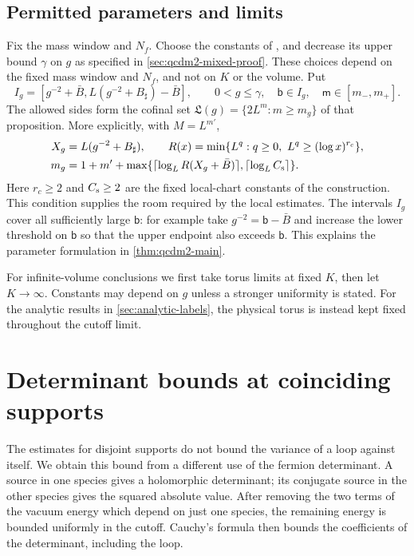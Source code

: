 \documentclass[11pt,letterpaper,reqno]{amsart}
\theoremstyle{definition}
\theoremstyle{remark}
\begin{document}
\subsection{Permitted parameters and limits}

Fix the mass window and $N_f$. Choose the constants of
\cite[Prop. 10.20]{QCDM1}, and decrease its upper bound
$\gamma$ on $g$ as specified in
\cref{sec:qcdm2-mixed-proof}. These choices depend on the fixed
mass window and $N_f$, and not on $K$ or the volume. Put
\[
 I_g=[g^{-2}+\bar B,L(g^{-2}+B_\sharp)-\bar B],\qquad
 0<g\le\gamma,\quad\mathsf b\in I_g,
 \quad\mathsf m\in[m_-,m_+].
\]
The allowed sides form the cofinal set
$\mathfrak L(g)=\{2L^m:m\ge m_g\}$ of that proposition.
More explicitly, with $M=L^{m'}$,
\[
 \begin{split}
 X_g&=L(g^{-2}+B_\sharp),\qquad
 R(x)=\min\{L^q:q\ge0,\ L^q\ge(\log x)^{r_c}\},\\
 m_g&=1+m'+\max\{\lceil\log_LR(X_g+\bar B)\rceil,
                         \lceil\log_L C_{\rm s}\rceil\}.
 \end{split}
\]
Here $r_c\ge2$ and $C_{\rm s}\ge2$ are the fixed local-chart
constants of the construction. This condition supplies the
room required by the local estimates.
The intervals $I_g$ cover all sufficiently large
$\mathsf b$: for example take $g^{-2}=\mathsf b-\bar B$ and
increase the lower threshold on $\mathsf b$ so that the upper
endpoint also exceeds $\mathsf b$. This explains the parameter
formulation in \cref{thm:qcdm2-main}.

For infinite-volume conclusions we first take torus limits at
fixed $K$, then let $K\to\infty$. Constants may depend on
$g$ unless a stronger uniformity is stated. For the analytic
results in \cref{sec:analytic-labels}, the physical torus is
instead kept fixed throughout the cutoff limit.


\section{Determinant bounds at coinciding supports}
\label{sec:qcdm2-circle}

The estimates for disjoint supports do not bound the variance of a
loop against itself.  We obtain this bound from a different use of
the fermion determinant.  A source in one species gives a
holomorphic determinant; its conjugate source in the other species
gives the squared absolute value.  After removing the two terms of
the vacuum energy which depend on just one species, the remaining
energy is bounded uniformly in the cutoff.  Cauchy's formula then
bounds the coefficients of the determinant, including the loop.
\end{document}
